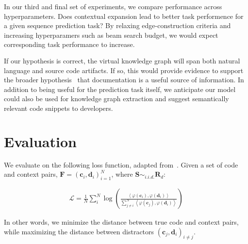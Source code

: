 \documentclass[11pt]{article}
\begin{document}

In our third and final set of experiments, we compare performance across hyperparameters. Does contextual expansion lead to better task performence for a given sequence prediction task? By relaxing edge-construction criteria and increasing hyperparamers such as beam search budget, we would expect corresponding task performance to increase.

If our hypothesis is correct, the virtual knowledge graph will span both natural language and source code artifacts. If so, this would provide evidence to support the broader hypothesis~\citep{guo2017semantically} that documentation is a useful source of information. In addition to being useful for the prediction task itself, we anticipate our model could also be used for knowledge graph extraction and suggest semantically relevant code snippets to developers.

\section{Evaluation}

We evaluate on the following loss function, adapted from~\citep{husain2019codesearchnet}. Given a set of code and context pairs, $\mathbf{F} = (\mathbf{c}_i, \mathbf{d}_i)_{i = 1}^N$, where $\mathbf S \sim_{i.i.d.} \mathbf R_{d}$:

\begin{align}
  \mathcal{L} = \frac{1}{N}\sum_i^N \log\left(\frac{\left<\varphi(\mathbf{c}_i), \varphi(\mathbf{d}_i)\right>}{\sum_{j \neq i}^N \left<\varphi(\mathbf{c}_j), \varphi(\mathbf{d}_i)\right>}\right)
\end{align}

In other words, we minimize the distance between true code and context pairs, while maximizing the distance between distractors $(\mathbf c_j, \mathbf d_i)_{i \neq j}$.

%
%
\end{document}
